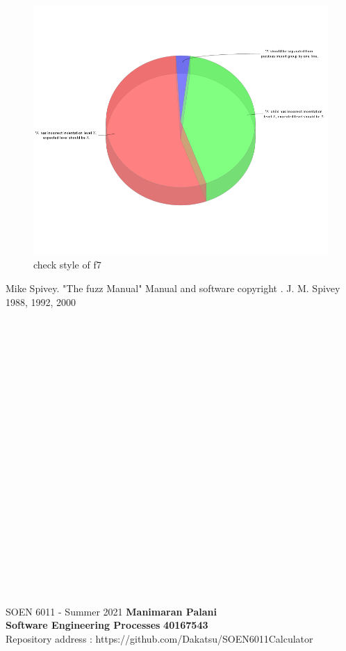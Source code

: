 \documentclass[letterpaper, 11pt]{report}
\begin{document}
\begin{figure}[htb]
    \centering
    \includegraphics[width=16cm]{F5222}
    \caption{check style of f7}
    \label{fig:galaxy}
\end{figure}

 \begin{thebibliography}{}
 
Mike Spivey. "The fuzz Manual" Manual and software copyright . J. M. Spivey 1988, 1992, 2000


\end{thebibliography}  
\newpage
\\
\\
\\
\\
\\
\\
\\
\\
\\
\\
\\
\\
\\
\\
\\
\\
\\
\\
\\

\section*{}
\normalsize {SOEN 6011 - Summer 2021} \hfill \textbf{Manimaran Palani} \\
\textbf{ Software Engineering Processes}  \hfill \textbf{40167543} \\
\hfill Repository address : https://github.com/Dakatsu/SOEN6011Calculator
\\
\end{document}
